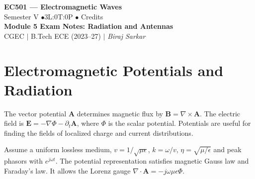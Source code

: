 \documentclass[12pt,a4paper]{article}
\begin{document}

\begin{center}
  {\LARGE\bfseries\color{myred} EC501 --- Electromagnetic Waves}\\[5pt]
  {\normalsize\color{mydark} Semester V \quad$\bullet$\quad 3L:0T:0P \quad$\bullet$ Credits}\\[3pt]
  {\normalsize\color{myteal}\textbf{Module 5 Exam Notes: Radiation and Antennas}}\\[3pt]
  {\small\color{mydark} CGEC \;$|$\; B.Tech ECE (2023--27) \;$|$\; \textit{Biraj Sarkar}}
\end{center}
\vspace{2pt}
\noindent{\color{myred}\rule{\linewidth}{1.5pt}}
\vspace{2pt}

\hypersetup{linkcolor=mydark}
\tableofcontents
\hypersetup{linkcolor=myteal}
\newpage

\section{Electromagnetic Potentials and Radiation}
\begin{tcolorbox}[defbox,title={Scalar and vector potentials}]
The vector potential $\mathbf A$ determines magnetic flux by $\mathbf B=\nabla\times\mathbf A$. The electric field is $\mathbf E=-\nabla\Phi-\partial_t\mathbf A$, where $\Phi$ is the scalar potential. Potentials are useful for finding the fields of localized charge and current distributions.
\end{tcolorbox}

Assume a uniform lossless medium, $v=1/\sqrt{\mu\epsilon}$, $k=\omega/v$, $\eta=\sqrt{\mu/\epsilon}$ and peak phasors with $e^{j\omega t}$. The potential representation satisfies magnetic Gauss law and Faraday's law. It allows the Lorenz gauge $\nabla\cdot\mathbf A=-j\omega\mu\epsilon\Phi$.
\end{document}
